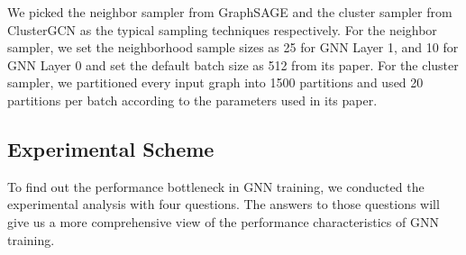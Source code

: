 We picked the neighbor sampler from GraphSAGE \cite{hamilton2017_graphsage} and the cluster sampler from ClusterGCN \cite{chiang2019_cluster_gcn} as the typical sampling techniques respectively.
For the neighbor sampler, we set the neighborhood sample sizes as 25 for GNN Layer 1, and 10 for GNN Layer 0 and set the default batch size as 512 from its paper\cite{hamilton2017_graphsage}.
For the cluster sampler, we partitioned every input graph into 1500 partitions and used 20 partitions per batch according to the parameters used in its paper\cite{chiang2019_cluster_gcn}.

\subsection{Experimental Scheme}
\label{sec:experimental_scheme}

To find out the performance bottleneck in GNN training, we conducted the experimental analysis with four questions.
The answers to those questions will give us a more comprehensive view of the performance characteristics of GNN training.

